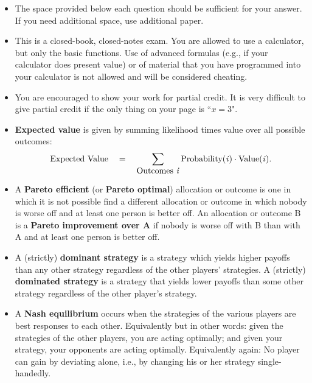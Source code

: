 \documentclass[twoside]{article}
\begin{document}
\begin{EXAM}

\begin{itemize}

\item The space provided below each question should be sufficient for your answer. If you need additional space, use additional paper.

\item This is a closed-book, closed-notes exam. You are allowed to use a calculator, but only the basic functions. Use of advanced formulas (e.g., if your calculator does present value) or of material that you have programmed into your calculator is not allowed and will be considered cheating.

\item You are encouraged to show your work for partial credit. It is very difficult to give partial credit if the only thing on your page is ``$x=3$".


\item \textbf{Expected value} is given by summing likelihood times value over all possible outcomes: 
\[
\mbox{Expected Value}\ \ \  = \ \ \ \sum_{\mbox{Outcomes \emph{i}}} \mbox{Probability(\emph{i})} \cdot \mbox{Value(\emph{i})}.
\]



\item A \textbf{Pareto efficient} (or \textbf{Pareto optimal}) allocation or outcome is one in which it is not possible find a different allocation or outcome in which nobody is worse off and at least one person is better off. An allocation or outcome B is a \textbf{Pareto improvement over A} if nobody is worse off with B than with A and at least one person is better off.

\item A (strictly) \textbf{dominant strategy} is a strategy which yields higher payoffs than any other strategy regardless of the other players' strategies. A (strictly) \textbf{dominated strategy} is a strategy that yields lower payoffs than some other strategy regardless of the other player's strategy.

\item A \textbf{Nash equilibrium} occurs when the strategies of the various players are best responses to each other. Equivalently but in other words: given the strategies of the other players, you are acting optimally; and given your strategy, your opponents are acting optimally. Equivalently again: No player can gain by deviating alone, i.e., by changing his or her strategy single-handedly. 
 

\end{itemize}
\end{EXAM}
\end{document}
